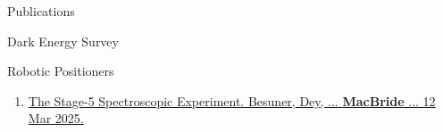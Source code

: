 \documentclass{resume} %
\begin{document}
\begin{rSection}{Publications}
\begin{rSubsection}{Dark Energy Survey}{}{}{}
    \end{rSubsection}    
    
%            
%            
%
%            
%            
%
%            
%            
%    
    \begin{rSubsection}{Robotic Positioners}{}{}{} %
        \begin{enumerate}
            \item \href{https://arxiv.org/abs/2503.07923}{The Stage-5 Spectroscopic Experiment. Besuner, Dey, ... \textbf{MacBride} ... 12 Mar 2025.}
            
        \end{enumerate}
            
    \end{rSubsection}        


    
\end{rSection}
\end{document}
